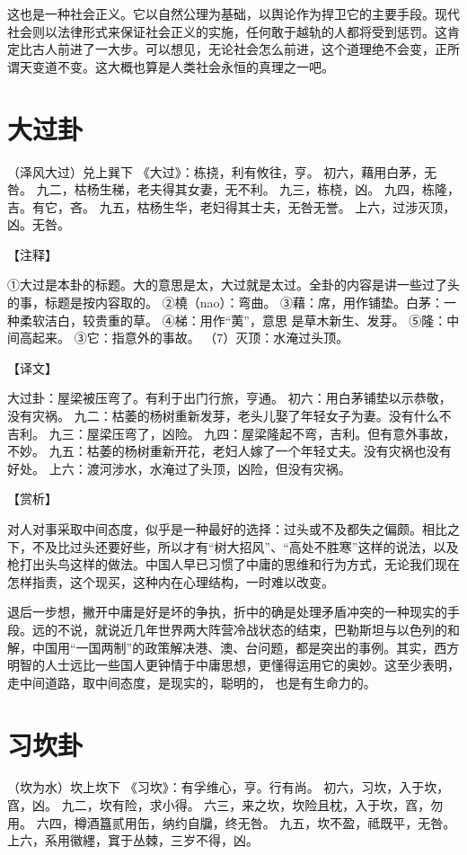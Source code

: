 \documentclass[a4paper,12pt,UTF8,twoside]{ctexbook}
\begin{document}
这也是一种社会正义。它以自然公理为基础，以舆论作为捍卫它的主要手段。现代社会则以法律形式来保证社会正义的实施，任何敢于越轨的人都将受到惩罚。这肯定比古人前进了一大步。可以想见，无论社会怎么前进，这个道理绝不会变，正所谓天变道不变。这大概也算是人类社会永恒的真理之一吧。

\chapter{大过卦}

（泽风大过）兑上巽下
《大过》：栋挠，利有攸往，亨。
初六，藉用白茅，无咎。
九二，枯杨生稊，老夫得其女妻，无不利。
九三，栋桡，凶。
九四，栋隆，吉。有它，吝。
九五，枯杨生华，老妇得其士夫，无咎无誉。
上六，过涉灭顶，凶。无咎。

【注释】

①大过是本卦的标题。大的意思是太，大过就是太过。全卦的内容是讲一些过了头的事，标题是按内容取的。
②橈（nao）：弯曲。
③藉：席，用作铺垫。白茅：一种柔软洁白，较贵重的草。
④梯：用作“荑”，意思 是草木新生、发芽。
⑤隆：中间高起来。
③它：指意外的事故。
（7）灭顶：水淹过头顶。

【译文】

大过卦：屋梁被压弯了。有利于出门行旅，亨通。
初六：用白茅铺垫以示恭敬，没有灾祸。
九二：枯萎的杨树重新发芽，老头儿娶了年轻女子为妻。没有什么不吉利。
九三：屋梁压弯了，凶险。
九四：屋梁隆起不弯，吉利。但有意外事故，不妙。
九五：枯萎的杨树重新开花，老妇人嫁了一个年轻丈夫。没有灾祸也没有好处。
上六：渡河涉水，水淹过了头顶，凶险，但没有灾祸。

【赏析】

对人对事采取中间态度，似乎是一种最好的选择：过头或不及都失之偏颇。相比之下，不及比过头还要好些，所以才有“树大招风”、“高处不胜寒”这样的说法，以及枪打出头鸟这样的做法。中国人早已习惯了中庸的思维和行为方式，无论我们现在怎样指责，这个现买，这种内在心理结构，一时难以改变。

退后一步想，撇开中庸是好是坏的争执，折中的确是处理矛盾冲突的一种现实的手段。远的不说，就说近几年世界两大阵营冷战状态的结束，巴勒斯坦与以色列的和解，中国用“一国两制”的政策解决港、澳、台问题，都是突出的事例。其实，西方明智的人士远比一些国人更钟情于中庸思想，更懂得运用它的奥妙。这至少表明，走中间道路，取中间态度，是现实的，聪明的， 也是有生命力的。

\chapter{习坎卦}

（坎为水）坎上坎下
《习坎》：有孚维心，亨。行有尚。
初六，习坎，入于坎，窞，凶。
九二，坎有险，求小得。
六三，来之坎，坎险且枕，入于坎，窞，勿用。
六四，樽酒簋贰用缶，纳约自牖，终无咎。
九五，坎不盈，祗既平，无咎。
上六，系用徽纆，窴于丛棘，三岁不得，凶。
\end{document}
